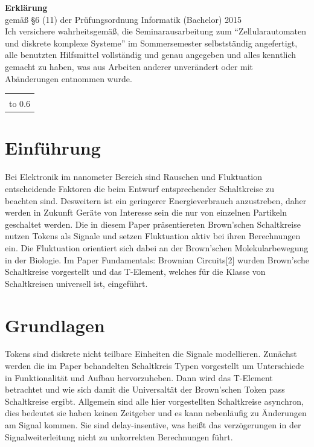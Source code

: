 {\thispagestyle{empty}\raggedright

\noindent \textbf{\Large Erklärung}\\[1ex]
gemäß \S 6 (11) der Prüfungsordnung Informatik %
(Bachelor) 2015 %
\\[\baselineskip]

\noindent
Ich versichere wahrheitsgemäß, die Seminarausarbeitung zum
\seminarart{} "`Zellularautomaten und diskrete komplexe Systeme"' im
Sommersemester \seminarjahr{} selbstständig angefertigt, alle
benutzten Hilfsmittel vollständig und genau angegeben und alles
kenntlich gemacht zu haben, was aus Arbeiten anderer unverändert oder
mit Abänderungen entnommen wurde.

\vspace*{30mm}
\noindent
\begin{tabular}{@{}l}
  \hline
   \\[-1ex]
  \hbox to 0.6\textwidth{(\teilnehmername, Matr.nr.~\teilnehmermatrnr) \hss}
\end{tabular}
}
\clearpage

\section{Einführung}
Bei Elektronik im nanometer Bereich sind Rauschen und Fluktuation 
entscheidende Faktoren die beim Entwurf entsprechender Schaltkreise 
zu beachten sind.
%
Desweitern ist ein geringerer Energieverbrauch anzustreben, daher 
werden in Zukunft Geräte von Interesse sein die nur von einzelnen 
Partikeln geschaltet werden.
%
Die in diesem Paper präsentiereten Brown'schen Schaltkreise nutzen Tokens
als Signale und setzen Fluktuation aktiv bei ihren Berechnungen ein.
Die Fluktuation orientiert sich dabei an der Brown'schen Molekularbewegung 
in der Biologie.
%
Im Paper Fundamentals: Brownian Circuits[2] wurden Brown'sche Schaltkreise 
vorgestellt und das T-Element, welches für die Klasse von Schaltkreisen 
universell ist, eingeführt.



\section{Grundlagen}
Tokens sind diskrete nicht teilbare Einheiten die Signale modellieren.
%
Zunächst werden die im Paper behandelten Schaltkreis Typen vorgestellt 
um Unterschiede in Funktionalität und Aufbau hervorzuheben. 
%
Dann wird das T-Element betrachtet und wie sich damit die Universaltät der
Brown'schen Token pass Schaltkreise ergibt.
%
Allgemein sind alle hier vorgestellten Schaltkreise asynchron, dies bedeutet sie
haben keinen Zeitgeber und es kann nebenläufig zu Änderungen am Signal kommen.
%
Sie sind delay-insentive, was heißt das verzögerungen in der Signalweiterleitung
nicht zu unkorrekten Berechnungen führt.


